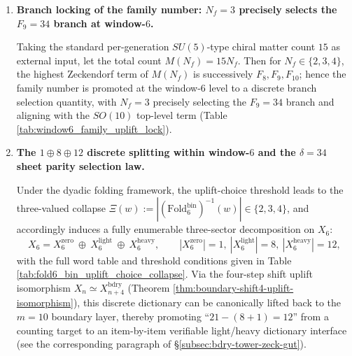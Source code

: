 \begin{enumerate}
  \item \textbf{Branch locking of the family number: \texorpdfstring{$N_f=3$}{Nf=3} precisely selects the \texorpdfstring{$F_9=34$}{F9=34} branch at window-\(6\).}

  \begin{theorem}
  \label{thm:terminal-family-uplift-lock}
  Taking the standard per-generation \(SU(5)\)-type chiral matter count \(15\) as external input, let the total count \(M(N_f)=15N_f\).
  Then for \(N_f\in\{2,3,4\}\), the highest Zeckendorf term of \(M(N_f)\) is successively \(F_8,F_9,F_{10}\);
  hence the family number is promoted at the window-\(6\) level to a discrete branch selection quantity, with \(N_f=3\) precisely selecting the \(F_9=34\) branch and aligning with the \(SO(10)\) top-level term (Table \ref{tab:window6_family_uplift_lock}).
  \end{theorem}

  \item \textbf{The \texorpdfstring{$1\oplus 8\oplus 12$}{1+8+12} discrete splitting within window-\(6\) and the \texorpdfstring{$\delta=34$}{delta=34} sheet parity selection law.}

  \begin{proposition}
  \label{prop:terminal-window6-1-8-12-split}
  Under the dyadic folding framework, the uplift-choice threshold leads to the three-valued collapse \(\Xi(w):=|(\mathrm{Fold}^{\mathrm{bin}}_6)^{-1}(w)|\in\{2,3,4\}\), and accordingly induces a fully enumerable three-sector decomposition on \(X_6\):
  \[
  X_6=X_6^{\mathrm{zero}}\ \oplus\ X_6^{\mathrm{light}}\ \oplus\ X_6^{\mathrm{heavy}},
  \qquad
  |X_6^{\mathrm{zero}}|=1,\ |X_6^{\mathrm{light}}|=8,\ |X_6^{\mathrm{heavy}}|=12,
  \]
  with the full word table and threshold conditions given in Table \ref{tab:fold6_bin_uplift_choice_collapse}.
  Via the four-step shift uplift isomorphism \(X_n\simeq X_{n+4}^{\mathrm{bdry}}\) (Theorem \ref{thm:boundary-shift4-uplift-isomorphism}), this discrete dictionary can be canonically lifted back to the \(m=10\) boundary layer, thereby promoting ``\(21-(8+1)=12\)'' from a counting target to an item-by-item verifiable light/heavy dictionary interface (see the corresponding paragraph of \S\ref{subsec:bdry-tower-zeck-gut}).
  \end{proposition}


\end{enumerate}
